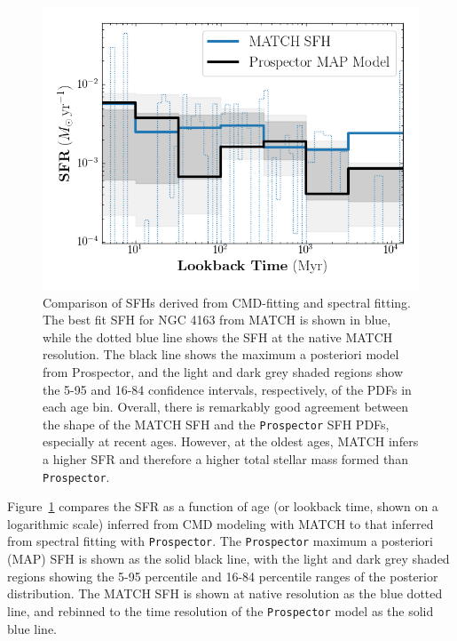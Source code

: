 \documentclass[preprint2]{aastex62}
\begin{document}
\begin{figure}[!ht]
\begin{centering}
\includegraphics[width=\linewidth]{figs/prospector-sfh.png}
\caption{{\sc Comparison of SFHs derived from CMD-fitting and spectral fitting.} The best fit SFH for NGC 4163 from MATCH is shown in blue, while the dotted blue line shows the SFH at the native MATCH resolution. The black line shows the maximum a posteriori model from Prospector, and the light and dark grey shaded regions show the 5-95 and 16-84 confidence intervals, respectively, of the PDFs in each age bin. Overall, there is remarkably good agreement between the shape of the MATCH SFH and the \texttt{Prospector} SFH PDFs, especially at recent ages. However, at the oldest ages, MATCH infers a higher SFR and therefore a higher total stellar mass formed than \texttt{Prospector}. \label{fig:prospector_sfh}}
\end{centering}
\end{figure}

Figure~\ref{fig:prospector_sfh} compares the SFR as a function of age (or lookback time, shown on a logarithmic scale) inferred from CMD modeling with MATCH to that inferred from spectral fitting with \texttt{Prospector}. The \texttt{Prospector} maximum a posteriori (MAP) SFH is shown as the solid black line, with the light and dark grey shaded regions showing the 5-95 percentile and 16-84 percentile ranges of the posterior distribution. The MATCH SFH is shown at native resolution as the blue dotted line, and rebinned to the time resolution of the \texttt{Prospector} model as the solid blue line.
\end{document}
